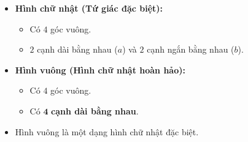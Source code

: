 \documentclass[12pt,a4paper]{article}
\begin{document}
\begin{minipage}[t]{0.49\textwidth}\vspace{0pt}
\begin{tcolorbox}[
  enhanced,
  colback=teal!4!white,
  colframe=teal!75!black,
  arc=2mm, boxrule=0.8pt,
  left=2mm, right=2mm, top=1.8mm, bottom=1.8mm,
  title={\footnotesize\bfseries\color{white}\faSquareO\ 2. Hình chữ nhật \& Hình vuông}
]
{\footnotesize
\begin{itemize}\setlength{\itemsep}{1pt}\setlength{\leftskip}{-2.5mm}
  \item \textbf{Hình chữ nhật (Tứ giác đặc biệt):}
  \begin{itemize}\setlength{\itemsep}{0.5pt}\setlength{\leftskip}{-2.5mm}
    \item Có $4$ góc vuông.
    \item $2$ cạnh dài bằng nhau ($a$) và $2$ cạnh ngắn bằng nhau ($b$).
  \end{itemize}
  \item \textbf{Hình vuông (Hình chữ nhật hoàn hảo):}
  \begin{itemize}\setlength{\itemsep}{0.5pt}\setlength{\leftskip}{-2.5mm}
    \item Có $4$ góc vuông.
    \item Có $\mathbf{4}$ \textbf{cạnh dài bằng nhau}.
  \end{itemize}
  \item Hình vuông là một dạng hình chữ nhật đặc biệt.
\end{itemize}
}
\end{tcolorbox}
\end{minipage}
\end{document}
